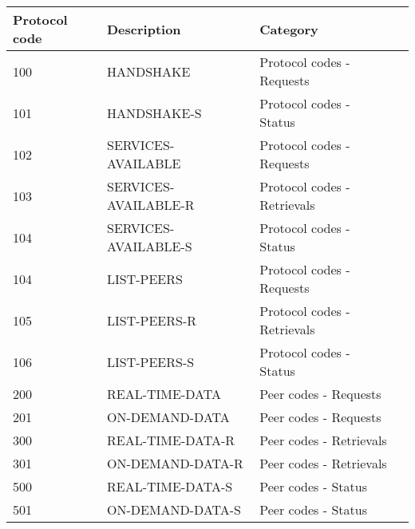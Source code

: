 {}
\begin{table}[H]
\centering
    \begin{tabular}{ | l | l | l | l |}
    \hline
    \textbf{Protocol code} & \textbf{Description} & \textbf{Category} \\ \hline
    
    100 & HANDSHAKE & Protocol codes - Requests\\ \hline

    101 & HANDSHAKE-S & Protocol codes - Status\\ \hline

    
    102 & SERVICES-AVAILABLE & Protocol codes - Requests\\ \hline

    103 & SERVICES-AVAILABLE-R & Protocol codes - Retrievals\\ \hline

    104 & SERVICES-AVAILABLE-S & Protocol codes - Status\\ \hline

    
    104 & LIST-PEERS & Protocol codes - Requests\\ \hline

    105 & LIST-PEERS-R & Protocol codes - Retrievals\\ \hline

    106 & LIST-PEERS-S & Protocol codes - Status\\ \hline

    
    200 & REAL-TIME-DATA & Peer codes - Requests\\ \hline

    201 & ON-DEMAND-DATA & Peer codes - Requests\\ \hline

    
    300 & REAL-TIME-DATA-R & Peer codes - Retrievals\\ \hline

    301 & ON-DEMAND-DATA-R & Peer codes - Retrievals\\ \hline


    500 & REAL-TIME-DATA-S & Peer codes - Status\\ \hline

    501 & ON-DEMAND-DATA-S & Peer codes - Status\\ \hline
    
    
    \end{tabular}    
\end{table}
\thispagestyle{empty}
\pagebreak

